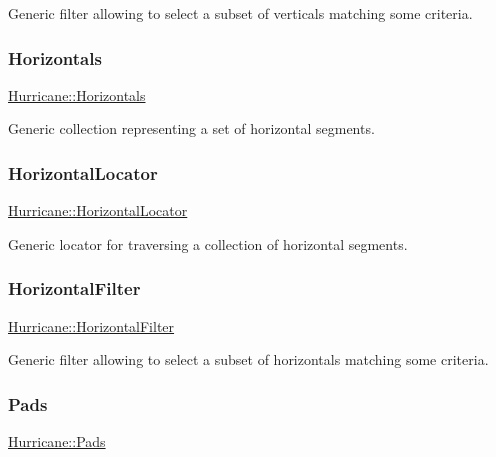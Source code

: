 Generic filter allowing to select a subset of verticals matching some criteria. \mbox{\label{namespaceHurricane_a721e644c7d97f2f66049ab062140b855}} 
\subsubsection{\texorpdfstring{Horizontals}{Horizontals}}
{\footnotesize\ttfamily \mbox{\hyperlink{namespaceHurricane_a721e644c7d97f2f66049ab062140b855}{Hurricane\+::\+Horizontals}}}

Generic collection representing a set of horizontal segments. \mbox{\label{namespaceHurricane_a7f4e07165be3dfcec8786e88370bdb67}} 
\subsubsection{\texorpdfstring{Horizontal\+Locator}{HorizontalLocator}}
{\footnotesize\ttfamily \mbox{\hyperlink{namespaceHurricane_a7f4e07165be3dfcec8786e88370bdb67}{Hurricane\+::\+Horizontal\+Locator}}}

Generic locator for traversing a collection of horizontal segments. \mbox{\label{namespaceHurricane_a56eb48037c2e1295fafe761bf179bf01}} 
\subsubsection{\texorpdfstring{Horizontal\+Filter}{HorizontalFilter}}
{\footnotesize\ttfamily \mbox{\hyperlink{namespaceHurricane_a56eb48037c2e1295fafe761bf179bf01}{Hurricane\+::\+Horizontal\+Filter}}}

Generic filter allowing to select a subset of horizontals matching some criteria. \mbox{\label{namespaceHurricane_abd1f433c44d8b515e1b8a8810aea1610}} 
\subsubsection{\texorpdfstring{Pads}{Pads}}
{\footnotesize\ttfamily \mbox{\hyperlink{namespaceHurricane_abd1f433c44d8b515e1b8a8810aea1610}{Hurricane\+::\+Pads}}}

